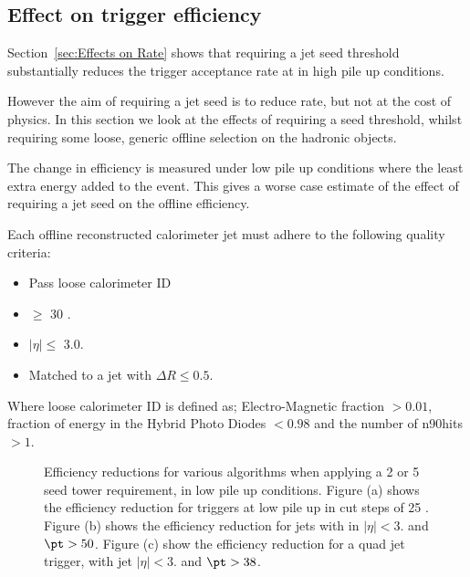 
\subsection{Effect on trigger efficiency} %
\label{sec:Effects of requiring a jet seed on offline efficiency}
Section~\ref{sec:Effects on Rate} shows that requiring a jet seed threshold
substantially reduces the trigger acceptance rate at in high pile up conditions.

However the aim of requiring a jet seed is to reduce rate, but not at the cost 
of physics. In this section we look at the effects of requiring a seed 
threshold, whilst requiring some loose, generic offline selection on the 
hadronic objects.

The change in efficiency is measured under low pile up conditions where the 
least extra energy added to the event. This gives a worse case estimate of the 
effect of requiring a jet seed on the offline efficiency.

Each offline reconstructed calorimeter jet must adhere to the following quality 
criteria:
\begin{itemize}
\item Pass loose calorimeter ID 
\item \PT $\geq$ 30 \GeV.
\item $|\eta| \leq$ 3.0.
\item Matched to a \Lone jet with $\Delta R \leq 0.5$.
\end{itemize}
Where loose calorimeter ID is defined as; Electro-Magnetic fraction $> 0.01$, 
fraction of energy in the Hybrid Photo Diodes $< 
0.98$ and the number of n90hits $> 1$.

\begin{figure}[h!]
    \centering
     \newline
    \caption{Efficiency reductions for various \Lone algorithms when applying a 
    2 or 5 \GeV seed tower requirement, in low pile up 
    conditions. Figure (a) shows the efficiency reduction for \HT triggers at 
    low pile up in cut steps of 25 \GeV. Figure (b) 
    shows the efficiency reduction for jets with in $|\eta| <3.$ and $\pt > 
    50$\GeV. Figure (c) show the efficiency reduction for a quad jet trigger, 
    with jet $|\eta| <3.$ and $\pt > 38$\GeV.}
    \label{fig:lowpuratereductionRECO}
\end{figure}



